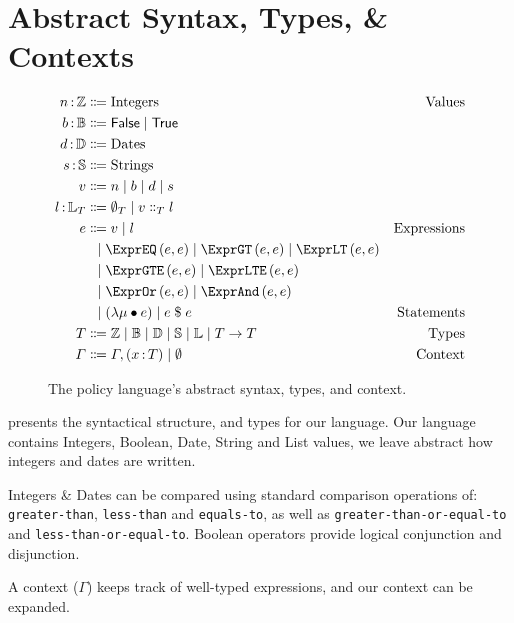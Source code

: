 \section{Abstract Syntax, Types, \& Contexts}\label{sec:defs}

\begin{figure}[ht]
  \centering
\begin{align*}
  \ty{n}{\mathbb{Z}}
  &
    \Coloneqq
    \text{Integers}
  & \text{Values}
  \\
  \ty{b}{\mathbb{B}}
  & \Coloneqq
    \mathsf{False}\alt\mathsf{True}
  \\
  \ty{d}{\mathbb{D}}
  & \Coloneqq
    \text{Dates}
  \\
  \ty{s}{\mathbb{S}}
  & \Coloneqq
    \text{Strings}
  \\
  v
  &
    \Coloneqq
    n
    \alt
    b
    \alt
    d
    \alt
    s
  \\
  \ty{l}{\mathbb{L}_T}
  & \Coloneqq
    \emptyset_T\alt{}v\Cons_T{}l
  \\
  e
  &
    \Coloneqq
    v
    \alt
    l
  & \text{Expressions}
  \\
  &
    \firstAlt
    \exprEQ{e}{e}
    \alt
    \exprGT{e}{e}
    \alt
    \exprLT{e}{e}
  \\
  & \firstAlt
    \exprGTE{e}{e}
    \alt
    \exprLTE{e}{e}
  &
  \\
  & \firstAlt
    \exprOr{e}{e}
    \alt
    \exprAnd{e}{e}
  &
  \\
  &
    \firstAlt
    \left( \lambda \mu \bullet e \right)
    \alt
    e \; \$ \; e
  &
    \text{Statements}
  \\
  T
  &
    \Coloneqq
    \mathbb{Z}
    \alt
    \mathbb{B}
    \alt
    \mathbb{D}
    \alt
    \mathbb{S}
    \alt
    \mathbb{L}
    \alt
    {T \rightarrow{} T}
  &
    \text{Types}
  \\
  \Gamma
  &
    \Coloneqq
    \envAdd{(\ty{x}{T})}
    \alt
    \emptyset
    &
      \text{Context}
\end{align*}
  \caption{\label{fig:syntax}The policy language's abstract syntax, types, and context.}
\end{figure}

 presents the syntactical structure, and types for our language.
Our language contains Integers, Boolean, Date, String and List values, we leave abstract how integers and dates are written.

Integers \& Dates can be compared using standard comparison operations of: \texttt{greater-than}, \texttt{less-than} and \texttt{equals-to}, as well as \texttt{greater-than-or-equal-to} and \texttt{less-than-or-equal-to}.
Boolean operators provide logical conjunction and disjunction.

A context ($\Gamma$) keeps track of well-typed expressions, and our context can be expanded.
